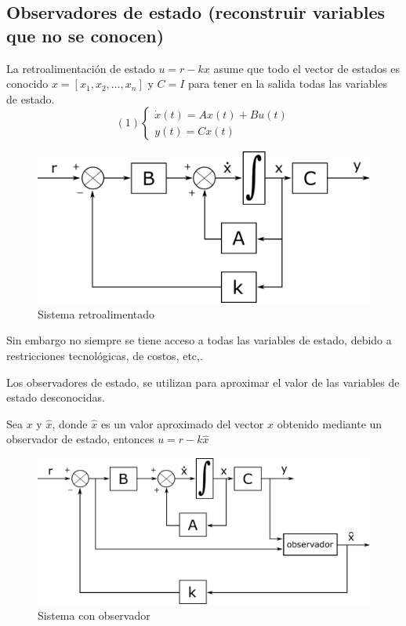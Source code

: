 \subsection{Observadores de estado (reconstruir variables que no se conocen)}

La retroalimentación de estado \( u = r - kx \) asume que todo el vector de estados es conocido \( x = [ x_{1}, x_{2}, \ldots, x_{n} ] \) y \( C=I \) para tener en la salida todas las variables de estado.
\[(1)
    \left\{
        \begin{array}{lll}
            \dot{x}(t) = Ax(t) + Bu(t) \\
            y(t) = Cx(t)
        \end{array}
    \right.
\]

\begin{figure}[ht]
    \centering
        \includegraphics[scale=0.19]{Control de Sistemas Mecatronicos Figuras/08 Sistema Retroalimentado.png}
        \caption{Sistema retroalimentado}
\end{figure}

Sin embargo no siempre se tiene acceso a todas las variables de estado, debido a restricciones tecnológicas, de costos, etc,.

Los observadores de estado, se utilizan para aproximar el valor de las variables de estado desconocidas.

Sea \( x \) y \( \hat{x} \), donde \( \hat{x} \) es un valor aproximado del vector \( x \) obtenido mediante un observador de estado, entonces \( u = r - k\hat{x} \)
\begin{figure}[ht]
    \centering
        \includegraphics[scale=0.18]{Control de Sistemas Mecatronicos Figuras/09 Sistema Retroalimentado con Observador Propuesto.png}
        \caption{Sistema con observador}
\end{figure}

